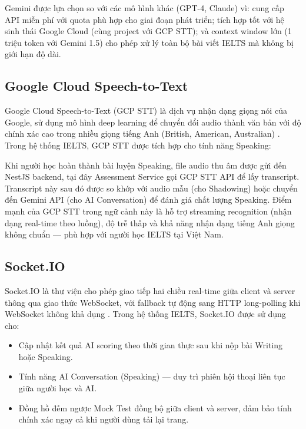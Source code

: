 \documentclass[a4paper,12pt]{extreport}
\begin{document}
Gemini được lựa chọn so với các mô hình khác (GPT-4, Claude) vì: cung cấp API miễn phí với quota phù hợp cho giai đoạn phát triển; tích hợp tốt với hệ sinh thái Google Cloud (cùng project với GCP STT); và context window lớn (1 triệu token với Gemini 1.5) cho phép xử lý toàn bộ bài viết IELTS mà không bị giới hạn độ dài.

\subsection{Google Cloud Speech-to-Text}

Google Cloud Speech-to-Text (GCP STT) là dịch vụ nhận dạng giọng nói của Google, sử dụng mô hình deep learning để chuyển đổi audio thành văn bản với độ chính xác cao trong nhiều giọng tiếng Anh (British, American, Australian) \cite{gcp-stt}. Trong hệ thống IELTS, GCP STT được tích hợp cho tính năng Speaking:

Khi người học hoàn thành bài luyện Speaking, file audio thu âm được gửi đến NestJS backend, tại đây Assessment Service gọi GCP STT API để lấy transcript. Transcript này sau đó được so khớp với audio mẫu (cho Shadowing) hoặc chuyển đến Gemini API (cho AI Conversation) để đánh giá chất lượng Speaking. Điểm mạnh của GCP STT trong ngữ cảnh này là hỗ trợ streaming recognition (nhận dạng real-time theo luồng), độ trễ thấp và khả năng nhận dạng tiếng Anh giọng không chuẩn — phù hợp với người học IELTS tại Việt Nam.

\subsection{Socket.IO}

Socket.IO là thư viện cho phép giao tiếp hai chiều real-time giữa client và server thông qua giao thức WebSocket, với fallback tự động sang HTTP long-polling khi WebSocket không khả dụng \cite{socketio-docs}. Trong hệ thống IELTS, Socket.IO được sử dụng cho:

\begin{itemize}
    \item Cập nhật kết quả AI scoring theo thời gian thực sau khi nộp bài Writing hoặc Speaking.
    \item Tính năng AI Conversation (Speaking) — duy trì phiên hội thoại liên tục giữa người học và AI.
    \item Đồng hồ đếm ngược Mock Test đồng bộ giữa client và server, đảm bảo tính chính xác ngay cả khi người dùng tải lại trang.
\end{itemize}
\end{document}
